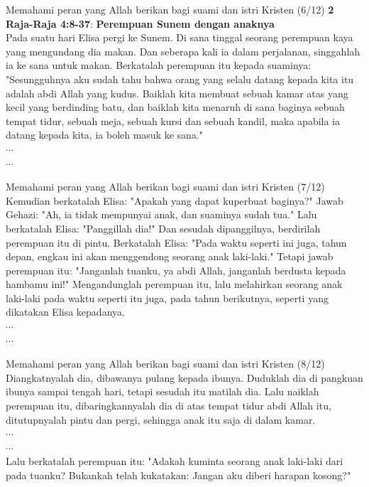 \documentclass{beamer}
\theoremstyle{mystyle}
\begin{document}
\begin{frame}{Memahami peran yang Allah berikan bagi suami dan istri Kristen (6/12)}
	\textbf{2 Raja-Raja 4:8-37}: \textbf{Perempuan Sunem dengan anaknya} \\
	Pada suatu hari Elisa pergi ke Sunem. Di sana tinggal seorang perempuan kaya yang mengundang dia makan. Dan seberapa kali ia dalam perjalanan, singgahlah ia ke sana untuk makan. Berkatalah perempuan itu kepada suaminya: "Sesungguhnya aku sudah tahu bahwa orang yang selalu datang kepada kita itu adalah abdi Allah yang kudus. Baiklah kita membuat sebuah kamar atas yang kecil yang berdinding batu, dan baiklah kita menaruh di sana baginya sebuah tempat tidur, sebuah meja, sebuah kursi dan sebuah kandil, maka apabila ia datang kepada kita, ia boleh masuk ke sana."  \\
	$\cdots$ \\
	$\cdots$
\end{frame}

\begin{frame}{Memahami peran yang Allah berikan bagi suami dan istri Kristen (7/12)}
	Kemudian berkatalah Elisa: "Apakah yang dapat kuperbuat baginya?" Jawab Gehazi: "Ah, ia tidak mempunyai anak, dan suaminya sudah tua." Lalu berkatalah Elisa: "Panggillah dia!" Dan sesudah dipanggilnya, berdirilah perempuan itu di pintu. Berkatalah Elisa: "Pada waktu seperti ini juga, tahun depan, engkau ini akan menggendong seorang anak laki-laki." Tetapi jawab perempuan itu: "Janganlah tuanku, ya abdi Allah, janganlah berdusta kepada hambamu ini!" Mengandunglah perempuan itu, lalu melahirkan seorang anak laki-laki pada waktu seperti itu juga, pada tahun berikutnya, seperti yang dikatakan Elisa kepadanya. \\
	$\cdots$ \\
	$\cdots$ 
\end{frame}

\begin{frame}{Memahami peran yang Allah berikan bagi suami dan istri Kristen (8/12)}
Diangkatnyalah dia, dibawanya pulang kepada ibunya. Duduklah dia di pangkuan ibunya sampai tengah hari, tetapi sesudah itu matilah dia. Lalu naiklah perempuan itu, dibaringkannyalah dia di atas tempat tidur abdi Allah itu, ditutupnyalah pintu dan pergi, sehingga anak itu saja di dalam kamar.	\\
	$\cdots$ \\
	$\cdots$ \\
Lalu berkatalah perempuan itu: "Adakah kuminta seorang anak laki-laki dari pada tuanku? Bukankah telah kukatakan: Jangan aku diberi harapan kosong?" 	
\end{frame}
\end{document}

